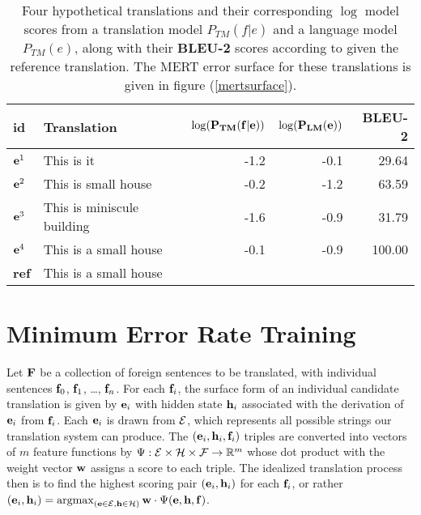 \documentclass[11pt,tightenlines,kern-1pt]{article}
\DeclareMathOperator*{\argmax}{argmax}
\begin{document}
\begin{table*}
\begin{center}
\begin{tabular}{|l|lrrr|}
\hline \bf id & \bf Translation  & \mbox{$\bf \log(P_{TM}(f|e))$}  & \mbox{$\bf \log(P_{LM}(e))$} & {\bf BLEU-2} \\
\hline
\mbox{${\bf e}^1$} & This is it  & -1.2 & -0.1 & 29.64 \\
\mbox{${\bf e}^2$} & This is small house   & -0.2 & -1.2 & 63.59 \\
\mbox{${\bf e}^3$} & This is miniscule building   & -1.6 & -0.9 & 31.79  \\
\mbox{${\bf e}^4$} & This is a small house   & -0.1 & -0.9 & 100.00  \\
\hline
{\bf ref}  & This is a small house & & & \\
\hline
\end{tabular}
\end{center}
\caption{
\label{hscores}
Four hypothetical translations and their corresponding \mbox{$\log$} model scores from a translation model \mbox{$P_{TM}(f|e)$} and a language model \mbox{$P_{TM}(e)$}, along with their {\bf BLEU-2} scores according to given the reference translation. The MERT error surface for these translations is given in figure (\ref{mertsurface}).}
\end{table*}

\section{Minimum Error Rate Training}

Let \mbox{${\bf F}$} be a collection of foreign sentences to be translated, with individual sentences \mbox{${\bf f}_0$}, \mbox{${\bf f}_1$}, \ldots, \mbox{${\bf f}_n$}. For each \mbox{${\bf f}_i$}, the surface form of an individual candidate translation is given by \mbox{${\bf e}_i$} with hidden state \mbox{${\bf h}_i$} associated with the derivation of \mbox{${\bf e}_i$} from \mbox{${\bf f}_i$}. Each \mbox{${\bf e}_i$} is drawn from \mbox{${\cal E}$}, which represents all possible strings our translation system can produce. The \mbox{$({\bf e}_i, {\bf h}_i, {\bf f}_i)$} triples are converted into vectors of \mbox{$m$} feature functions by \mbox{${\Psi }:{\cal E}\times{\cal H}\times{\cal F} \rightarrow \mathbb{R}^m$} whose dot product with the weight vector \mbox{${\bf w}$} assigns a score to each triple. The idealized translation process then is to find the highest scoring pair \mbox{$({\bf e}_i, {\bf h}_i)$} for each \mbox{${\bf f}_i$}, or rather \mbox{$({\bf e}_i, {\bf h}_i) = \argmax_{({\bf e} \in {\cal E}, {\bf h} \in {\cal H})} {\bf w} \cdot \Psi({\bf e}, {\bf h}, {\bf f})$}. 
\end{document}

